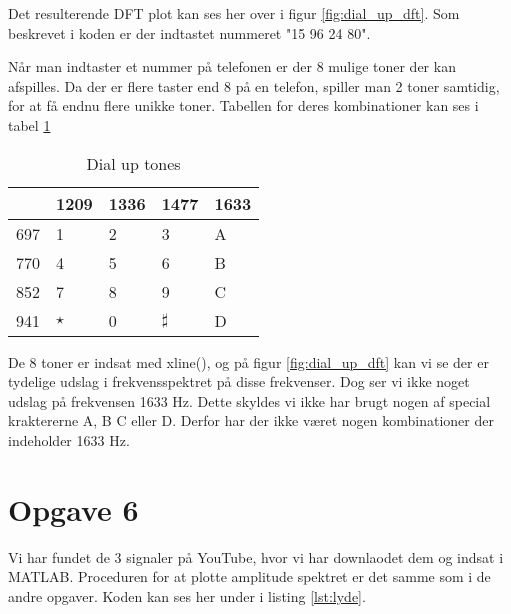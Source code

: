 \documentclass[../main.tex]{subfiles}
\begin{document}

Det resulterende DFT plot kan ses her over i figur \ref{fig:dial_up_dft}. Som beskrevet i koden er der indtastet nummeret "15 96 24 80". 

Når man indtaster et nummer på telefonen er der 8 mulige toner der kan afspilles. Da der er flere taster end 8 på en telefon, spiller man 2 toner samtidig, for at få endnu flere unikke toner. Tabellen for deres kombinationer kan ses i tabel \ref{tab:dial}

\begin{table}
  \centering
  \begin{tabular}{l|llll}
    & 1209 & 1336 & 1477 & 1633 \\ \hline
    697 & 1 & 2 & 3 & A \\
    770 & 4 & 5 & 6 & B \\
    852 & 7 & 8 & 9 & C \\
    941 & $\star$ & 0 & $\sharp$ & D \\
  \end{tabular}
  \caption{Dial up tones}
  \label{tab:dial}
\end{table}

De 8 toner er indsat med xline(), og på figur \ref{fig:dial_up_dft} kan vi se der er tydelige udslag i frekvensspektret på disse frekvenser. Dog ser vi ikke noget udslag på frekvensen 1633 Hz. Dette skyldes vi ikke har brugt nogen af special kraktererne A, B C eller D. Derfor har der ikke været nogen kombinationer der indeholder 1633 Hz.

\section{Opgave 6}

Vi har fundet de 3 signaler på YouTube, hvor vi har downlaodet dem og indsat i MATLAB. Proceduren for at plotte amplitude spektret er det samme som i de andre opgaver. Koden kan ses her under i listing \ref{lst:lyde}.
\end{document}
